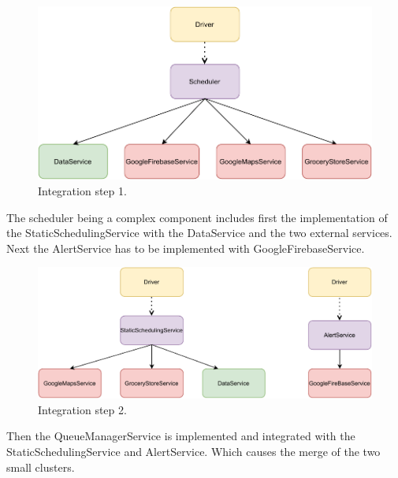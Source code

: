 \begin{figure}[H]
    \centering
    \includegraphics[width=1.0\textwidth]{images/component1.pdf}
    \caption{Integration step 1.}
\end{figure}

The scheduler being a complex component includes first the implementation of the StaticSchedulingService with the DataService and the two external services. Next the AlertService has to be implemented with GoogleFirebaseService.

\begin{figure}[H]
    \centering
    \includegraphics[width=1.0\textwidth]{images/component2.pdf}
    \caption{Integration step 2.}
\end{figure}

Then the QueueManagerService is implemented and integrated with the StaticSchedulingService and AlertService. Which causes the merge of the two small clusters.

